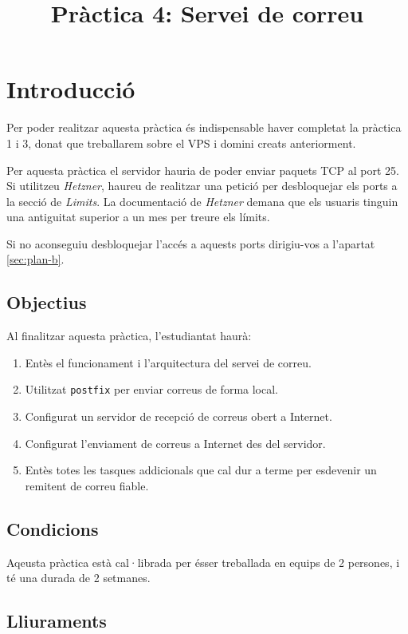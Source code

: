 \documentclass{practicaitic}
\title{Pràctica 4: Servei de correu}
\begin{document}
\section{Introducció}

Per poder realitzar aquesta pràctica és indispensable haver completat la
pràctica 1 i 3, donat que treballarem sobre el VPS i domini creats anteriorment.

\begin{tcolorbox}[
  title=Atenció,
  colback=red!10, colframe=red!50,
  rounded corners
]
Per aquesta pràctica el servidor hauria de poder enviar paquets TCP al 
port 25. Si utilitzeu \textit{Hetzner}, haureu de realitzar una petició
per desbloquejar els ports a la secció de \textit{Limits}.
La documentació de \textit{Hetzner} demana que els usuaris tinguin una
antiguitat superior a un mes per treure els límits.
\newline

Si no aconseguiu desbloquejar l'accés a aquests ports dirigiu-vos a
l'apartat \ref{sec:plan-b}.
\end{tcolorbox}

\subsection{Objectius}

Al finalitzar aquesta pràctica, l'estudiantat haurà:
\begin{enumerate}
  \item Entès el funcionament i l'arquitectura del servei de correu.
  \item Utilitzat \texttt{postfix} per enviar correus de forma local.
  \item Configurat un servidor de recepció de correus obert a Internet.
  \item Configurat l'enviament de correus a Internet des del servidor.
  \item Entès totes les tasques addicionals que cal dur a terme per
  esdevenir un remitent de correu fiable.
\end{enumerate}

\subsection{Condicions}

Aqeusta pràctica està cal·librada per ésser treballada en equips de 2 persones,
i té una durada de 2 setmanes.

\subsection{Lliuraments}
\end{document}
